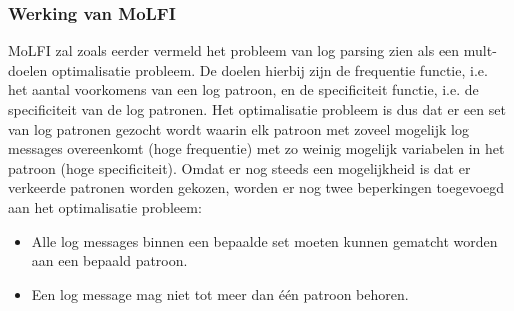 \subsubsection{Werking van MoLFI}
MoLFI zal zoals eerder vermeld het probleem van log parsing zien als een mult-doelen optimalisatie probleem. De doelen hierbij zijn de frequentie functie, i.e. het aantal voorkomens van een log patroon, en de specificiteit functie, i.e. de specificiteit van de log patronen. Het optimalisatie probleem is dus dat er een set van log patronen gezocht wordt waarin elk patroon met zoveel mogelijk log messages overeenkomt (hoge frequentie) met zo weinig mogelijk variabelen in het patroon (hoge specificiteit). Omdat er nog steeds een mogelijkheid is dat er verkeerde patronen worden gekozen, worden er nog twee beperkingen toegevoegd aan het optimalisatie probleem:
\begin{itemize}
    \item Alle log messages binnen een bepaalde set moeten kunnen gematcht worden aan een bepaald patroon.
    \item Een log message mag niet tot meer dan één patroon behoren.
\end{itemize}

